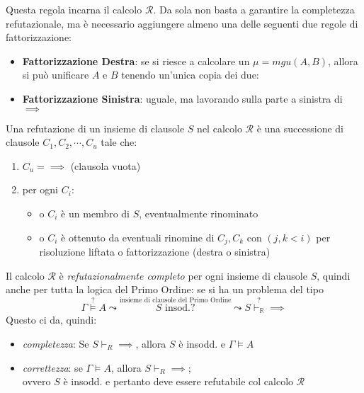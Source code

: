 Questa regola incarna il calcolo $\mathscr{R}$. Da sola non basta a garantire la completezza 
refutazionale, ma è necessario aggiungere almeno una delle seguenti due 
regole di fattorizzazione: 
\begin{itemize}
  \item \textbf{Fattorizzazione Destra}: se si riesce a calcolare un $\mu = mgu(A,B)$, allora si può unificare $A$ e $B$ tenendo un'unica copia dei due:
    \begin{prooftree}
    \end{prooftree}
  \item \textbf{Fattorizzazione Sinistra}: uguale, ma lavorando sulla parte a sinistra di $\implies$
    \begin{prooftree}
    \end{prooftree}
\end{itemize}

Una refutazione di un insieme di clausole $S$ nel calcolo $\mathscr{R}$ è una successione di clausole $C_1, C_2, \cdots, C_u$ tale che: 
\begin{enumerate}
  \item $C_u = \implies$ (clausola vuota)
  \item per ogni $C_i$:
    \begin{itemize}
      \item o $C_i$ è un membro di $S$, eventualmente rinominato
      \item o $C_i$ è ottenuto da eventuali rinomine di $C_j, C_k$ con $(j,k < i)$ per risoluzione liftata o fattorizzazione (destra o sinistra)
    \end{itemize}
\end{enumerate}
Il calcolo $\mathscr{R}$ è \textit{refutazionalmente completo} per ogni insieme di clausole $S$, quindi anche per tutta la logica del Primo Ordine: se si ha un problema del tipo
$$
\Gamma \stackrel{?}{\models} A \leadsto \stackrel {\text{insieme di clausole del Primo Ordine}} {S \text{ insod.?}} \leadsto S \stackrel ? {\vdash_\mathbb{R}} \implies
$$
Questo ci da, quindi:
\begin{itemize}
  \item \textit{completezza}: Se $S \vdash_R \implies$, allora $S$ è insodd. e $\Gamma \models A$
  \item \textit{correttezza}: se $\Gamma \models A$, allora $S \vdash_R \implies$; \\
  ovvero $S$ è insodd. e pertanto deve essere refutabile col calcolo $\mathscr{R}$
\end{itemize} 


